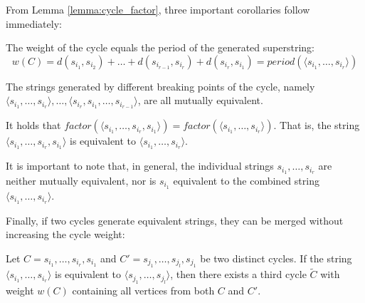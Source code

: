 From Lemma \ref{lemma:cycle_factor}, three important corollaries follow
immediately:

\begin{corollary} \label{cor:cycle_weight_period}
The weight of the cycle equals the period of the generated superstring:
\begin{equation}
w(C) = d(s_{i_1}, s_{i_2}) + \dots + d(s_{i_{r-1}}, s_{i_r}) + d(s_{i_r}, s_{i_1}) = \textit{period}(\langle s_{i_1}, \dots, s_{i_r} \rangle)
\end{equation}
\end{corollary}

\begin{corollary} \label{cor:cycle_equivalence}
The strings generated by different breaking points of the cycle, namely $\langle
s_{i_1}, \dots, s_{i_r} \rangle, \dots, \langle s_{i_r}, s_{i_1}, \dots,
s_{i_{r-1}} \rangle$, are all mutually equivalent.
\end{corollary}

\begin{corollary} \label{cor:cycle_extension_equivalence} It holds that $\textit{factor}(\langle s_{i_1}, \dots, s_{i_r}, s_{i_1} \rangle) = \textit{factor}(\langle s_{i_1}, \dots, s_{i_r} \rangle)$. That is, the string $\langle s_{i_1}, \dots, s_{i_r}, s_{i_1} \rangle$ is equivalent to $\langle s_{i_1}, \dots, s_{i_r} \rangle$.
\end{corollary}

It is important to note that, in general, the individual strings $s_{i_1},
\dots, s_{i_r}$ are neither mutually equivalent, nor is $s_{i_1}$ equivalent to
the combined string $\langle s_{i_1}, \dots, s_{i_r} \rangle$.

Finally, if two cycles generate equivalent strings, they can be merged without
increasing the cycle weight:

\begin{lemma} \label{lemma:cycle_merging}
Let $C = s_{i_1}, \dots, s_{i_r}, s_{i_1}$ and $C' = s_{j_1}, \dots, s_{j_l},
s_{j_1}$ be two distinct cycles. If the string $\langle s_{i_1}, \dots, s_{i_r}
\rangle$ is equivalent to $\langle s_{j_1}, \dots, s_{j_l} \rangle$, then there
exists a third cycle $\tilde{C}$ with weight $w(C)$ containing all vertices from
both $C$ and $C'$.
\end{lemma}

